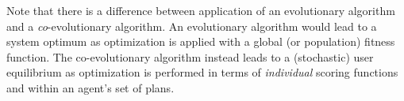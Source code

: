 Note that there is a difference between application of an evolutionary algorithm and a \emph{co}-evolutionary algorithm. An evolutionary algorithm would lead to a system optimum as optimization is applied with a global (or population) fitness function. The co-evolutionary algorithm instead leads to a (stochastic) user \gls{equilibrium} as optimization is performed in terms of \emph{individual} scoring functions and within an agent's set of plans. 
%

%
%
%
%
%
%
%
%
%

